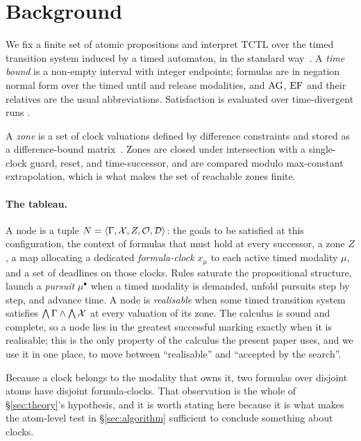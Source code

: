 \section{Background}
\label{sec:background}

We fix a finite set of atomic propositions and interpret TCTL over the timed
transition system induced by a timed automaton, in the standard
way~\cite{AlurCourcoubetisDill1990,Baier08}. A \emph{time bound} \kI is a
non-empty interval with integer endpoints; formulas are in negation normal form
over the timed until and release modalities, and $\mathrm{AG}$, $\mathrm{EF}$ and their
relatives are the usual abbreviations. Satisfaction is evaluated over
time-divergent runs \Runsinf.

A \emph{zone} is a set of clock valuations defined by difference constraints and
stored as a difference-bound matrix~\cite{AlurDill1994,Bouyer05TimedAutomata}.
Zones are closed under intersection with a single-clock guard, reset, and
time-successor, and are compared modulo max-constant extrapolation, which is
what makes the set of reachable zones finite.

\paragraph{The tableau.} A node is a tuple
$N=\langle \Gamma,\mathcal{X},Z,\mathcal{O},\mathcal{D}\rangle$: the goals \Gam to be satisfied at this
configuration, the context \Ctx of formulas that must hold at every successor,
a zone $Z$, a map \obl allocating a dedicated \emph{formula-clock} $x_\mu$ to
each active timed modality $\mu$, and a set \Dl of deadlines on those clocks.
Rules saturate the propositional structure, launch a \emph{pursuit} $\mu^\bullet$
when a timed modality is demanded, unfold pursuits step by step, and advance
time. A node is \emph{realisable} when some timed transition system satisfies
$\bigwedge\Gamma\wedge\bigwedge\mathcal{X}$ at every valuation of its zone. The calculus
is sound and complete, so a node lies in the greatest successful marking exactly
when it is realisable; this is the only property of the calculus the present
paper uses, and we use it in one place, to move between ``realisable'' and
``accepted by the search''.

Because a clock belongs to the modality that owns it, two formulas over disjoint
atoms have disjoint formula-clocks. That observation is the whole of
\S\ref{sec:theory}'s hypothesis, and it is worth stating here because it is what
makes the atom-level test in \S\ref{sec:algorithm} sufficient to conclude
something about clocks.
